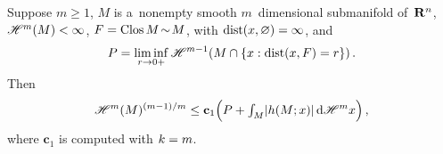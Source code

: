 \begin{corollary}
    \label{al:7.2}
    Suppose $m \ge 1$, $M$ is a~nonempty smooth $m$~dimensional submanifold of~$\mathbf{R}^{n}$,
    $\mathscr{H}^m(M) < \infty$, $F = \mathop{\mathrm{Clos}}M \!\sim\! M$, with $\operatorname{dist}(x,\varnothing) = \infty$, and
    \begin{displaymath}
        P = \liminf_{r \to 0+} \mathscr{H}^{m-1}(M \cap \{ x : \operatorname{dist}(x,F) = r \}) \,.
    \end{displaymath}
    Then
    \begin{displaymath}
        \mathscr{H}^m(M)^{(m-1)/m} \le \mathbf{c}_1 \Big( P + {\textstyle\int_{M}^{}} |h(M;x)| \,\mathrm{d} \mathscr{H}^m x \Big) \,,
    \end{displaymath}
    where $\mathbf{c}_1$ is computed with $k = m$.
\end{corollary}

